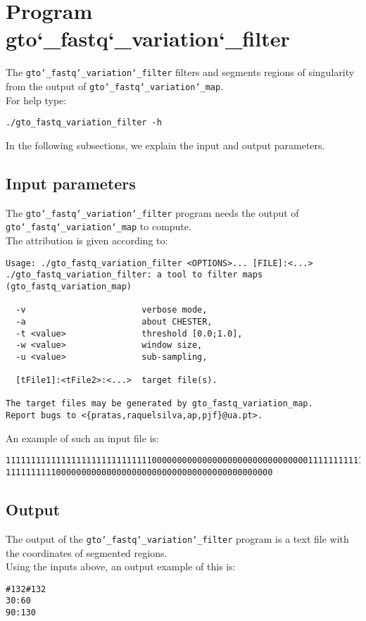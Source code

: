 \section{Program gto\char`_fastq\char`_variation\char`_filter}

The \texttt{gto\char`_fastq\char`_variation\char`_filter} filters and segments regions of singularity from the output of \texttt{gto\char`_fastq\char`_variation\char`_map}.\\

For help type:
\begin{lstlisting}
./gto_fastq_variation_filter -h
\end{lstlisting}
In the following subsections, we explain the input and output parameters.

\subsection*{Input parameters}

The \texttt{gto\char`_fastq\char`_variation\char`_filter} program needs the output of \texttt{gto\char`_fastq\char`_variation\char`_map} to compute.\\

The attribution is given according to:
\begin{lstlisting}
Usage: ./gto_fastq_variation_filter <OPTIONS>... [FILE]:<...>      
./gto_fastq_variation_filter: a tool to filter maps (gto_fastq_variation_map)  
                                                     
  -v                       verbose mode,             
  -a                       about CHESTER,            
  -t <value>               threshold [0.0;1.0],      
  -w <value>               window size,              
  -u <value>               sub-sampling,             
                                                     
  [tFile1]:<tFile2>:<...>  target file(s).           
                                                     
The target files may be generated by gto_fastq_variation_map.    
Report bugs to <{pratas,raquelsilva,ap,pjf}@ua.pt>. 
\end{lstlisting}
An example of such an input file is:
\begin{lstlisting}
1111111111111111111111111111100000000000000000000000000000001111111111111111111
11111111110000000000000000000000000000000000000000000
\end{lstlisting}

\subsection*{Output}

The output of the \texttt{gto\char`_fastq\char`_variation\char`_filter} program is a text file with the coordinates of segmented regions.\\
Using the inputs above, an output example of this is:

\begin{lstlisting}
#132#132
30:60
90:130
\end{lstlisting}